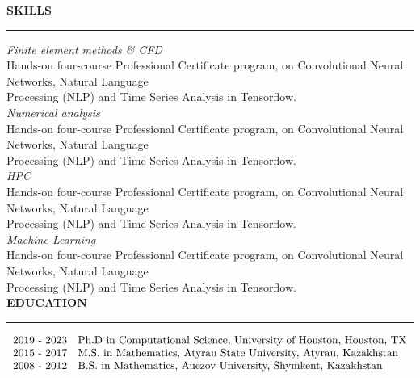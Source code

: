 \documentclass[10pt,letterpaper]{letter}
\newcommand{\gbullet}{\textcolor{gray}{\textbullet} }
\newcommand{\gsect}[1]{\textcolor{codepurple}{\textbf{{\Large \uppercase{#1} }}} \\ \hrule}
\begin{document}
\gsect{Skills}
\textsl{Finite element methods \& CFD}\\
\hspace*{10mm}  Hands-on four-course Professional Certificate program, on Convolutional Neural Networks, Natural Language \\ \hspace*{10mm} Processing (NLP) and Time Series Analysis in Tensorflow.\\
\textsl{Numerical analysis}\\
\hspace*{10mm}  Hands-on four-course Professional Certificate program, on Convolutional Neural Networks, Natural Language \\ \hspace*{10mm} Processing (NLP) and Time Series Analysis in Tensorflow.\\
\textsl{HPC}\\
\hspace*{10mm}  Hands-on four-course Professional Certificate program, on Convolutional Neural Networks, Natural Language \\ \hspace*{10mm} Processing (NLP) and Time Series Analysis in Tensorflow.\\
\textsl{Machine Learning}\\
\hspace*{10mm}  Hands-on four-course Professional Certificate program, on Convolutional Neural Networks, Natural Language \\ \hspace*{10mm} Processing (NLP) and Time Series Analysis in Tensorflow.\\

\gsect{Education}

$\begin{array}{r l }
\text{2019 - 2023} & \text{Ph.D in Computational Science, University of Houston, Houston, TX} \\
\text{2015 - 2017} & \text{M.S. in Mathematics, Atyrau State University, Atyrau, Kazakhstan}\\
 \text{2008 - 2012} & \text{B.S. in Mathematics, Auezov University, Shymkent, Kazakhstan}
\end{array}$
\end{document}
